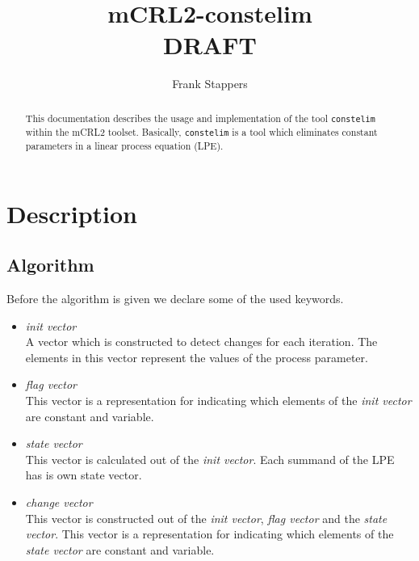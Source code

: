 \documentclass[a4paper,9pt]{article}
\title{mCRL2-constelim \\ DRAFT}
\author{Frank Stappers}
\begin{document}
\maketitle

\begin{abstract}
This documentation describes the usage and implementation of  the tool \verb"constelim" within the mCRL2 toolset. 
Basically, \verb"constelim" is a tool which eliminates constant parameters in a linear process equation (LPE).
\end{abstract}

\section{Description} \label{sec:dec}

\subsection{Algorithm}
Before the algorithm is given we declare some of the used keywords.
\begin{itemize}
\item \textit{init vector} \\ A vector which is constructed to detect changes for each iteration. 
 The elements in this vector represent the values of the process parameter.
\item \textit{flag vector} \\ This vector is a representation for indicating which elements of the \textit{init vector} 
are constant and variable. 
\item \textit{state vector} \\ This vector is calculated out of the \textit{init vector}. 
Each summand of the LPE has is own state vector.
\item \textit{change vector} \\ This vector is constructed out of the \textit{init vector}, \textit{flag vector} 
and the \textit{state vector}. This vector is a representation for indicating which elements of the \textit{state vector}
are constant and variable. 
\end{itemize}
\end{document}
